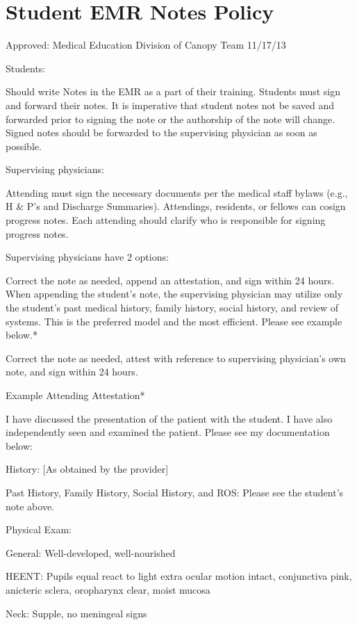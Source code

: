 \documentclass[
]{book}
\begin{document}
\hypertarget{student-emr-notes-policy}{%
\chapter{Student EMR Notes Policy}\label{student-emr-notes-policy}}

Approved: Medical Education Division of Canopy Team 11/17/13

Students:

Should write Notes in the EMR as a part of their training. Students must sign and forward their notes. It is imperative that student notes not be saved and forwarded prior to signing the note or the authorship of the note will change. Signed notes should be forwarded to the supervising physician as soon as possible.

Supervising physicians:

Attending must sign the necessary documents per the medical staff bylaws (e.g., H \& P's and Discharge Summaries). Attendings, residents, or fellows can cosign progress notes. Each attending should clarify who is responsible for signing progress notes.

Supervising physicians have 2 options:

Correct the note as needed, append an attestation, and sign within 24 hours. When appending the student's note, the supervising physician may utilize only the student's past medical history, family history, social history, and review of systems. This is the preferred model and the most efficient. Please see example below.*

Correct the note as needed, attest with reference to supervising physician's own note, and sign within 24 hours.

Example Attending Attestation*

I have discussed the presentation of the patient with the student. I have also independently seen and examined the patient. Please see my documentation below:

History: {[}As obtained by the provider{]}

Past History, Family History, Social History, and ROS: Please see the student's note above.

Physical Exam:

General: Well-developed, well-nourished

HEENT: Pupils equal react to light extra ocular motion intact, conjunctiva pink, anicteric sclera, oropharynx clear, moist mucosa

Neck: Supple, no meningeal signs
\end{document}
